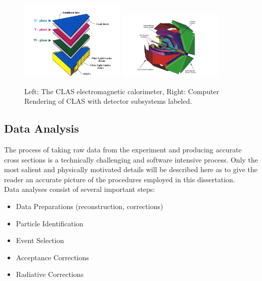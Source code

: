 \begin{figure}
  \centering
  \includegraphics[width=5cm]{image/ec.png}
  \includegraphics[width=5cm]{image/clas.png}
  \caption{ Left: The CLAS electromagnetic calorimeter, Right: Computer Rendering of CLAS with detector subsystems labeled.}
  \label{fig:ec_clas}
\end{figure}

\subsection{Data Analysis}
The process of taking raw data from the experiment and producing accurate cross sections is a technically challenging and software intensive process.  Only the most salient and physically motivated details will be described here as to give the reader an accurate picture of the procedures employed in this dissertation.  \\ 

Data analyses consist of several important steps:

\begin{itemize}
\item Data Preparations (reconstruction, corrections)
\item Particle Identification
\item Event Selection
\item Acceptance Corrections
\item Radiative Corrections
\end{itemize}

